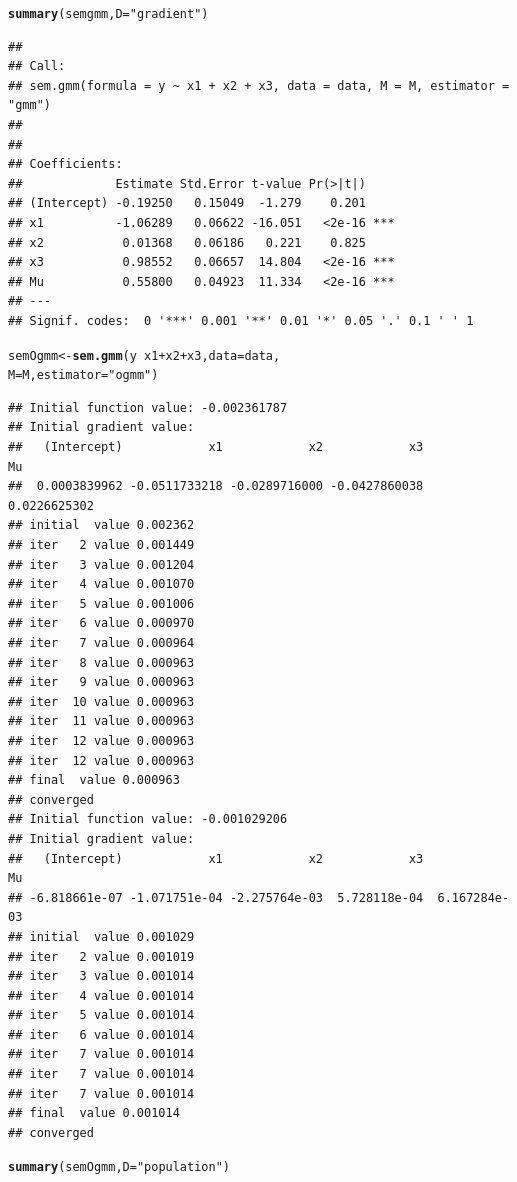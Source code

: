 \documentclass[english,12pt]{book}\usepackage[]{graphicx}\usepackage[]{xcolor}
\makeatletter
\newcommand{\hlsng}[1]{\textcolor[rgb]{0.192,0.494,0.8}{#1}}%
\newcommand{\hlopt}[1]{\textcolor[rgb]{0,0,0}{#1}}%
\newcommand{\hldef}[1]{\textcolor[rgb]{0.345,0.345,0.345}{#1}}%
\newcommand{\hlkwb}[1]{\textcolor[rgb]{0.69,0.353,0.396}{#1}}%
\newcommand{\hlkwc}[1]{\textcolor[rgb]{0.333,0.667,0.333}{#1}}%
\newcommand{\hlkwd}[1]{\textcolor[rgb]{0.737,0.353,0.396}{\textbf{#1}}}%
\newenvironment{kframe}{%
 \def\at@end@of@kframe{}%
 \ifinner\ifhmode%
  \def\at@end@of@kframe{\end{minipage}}%
  \begin{minipage}{\columnwidth}%
 \fi\fi%
 \def\FrameCommand##1{\hskip\@totalleftmargin \hskip-\fboxsep
 \colorbox{shadecolor}{##1}\hskip-\fboxsep
     \hskip-\linewidth \hskip-\@totalleftmargin \hskip\columnwidth}%
 \MakeFramed {\advance\hsize-\width
   \@totalleftmargin\z@ \linewidth\hsize
   \@setminipage}}%
 {\par\unskip\endMakeFramed%
 \at@end@of@kframe}
\newenvironment{knitrout}{}{} %
\let\hlstd\hldef
\let\hlstr\hlsng
\makeatother
\begin{document}
\begin{knitrout}
\begin{kframe}
\begin{alltt}
\hlkwd{summary}\hlstd{(semgmm,} \hlkwc{D} \hlstd{=} \hlstr{"gradient"}\hlstd{)}
\end{alltt}
\begin{verbatim}
## 
## Call:
## sem.gmm(formula = y ~ x1 + x2 + x3, data = data, M = M, estimator = "gmm")
## 
## 
## Coefficients:
##             Estimate Std.Error t-value Pr(>|t|)    
## (Intercept) -0.19250   0.15049  -1.279    0.201    
## x1          -1.06289   0.06622 -16.051   <2e-16 ***
## x2           0.01368   0.06186   0.221    0.825    
## x3           0.98552   0.06657  14.804   <2e-16 ***
## Mu           0.55800   0.04923  11.334   <2e-16 ***
## ---
## Signif. codes:  0 '***' 0.001 '**' 0.01 '*' 0.05 '.' 0.1 ' ' 1
\end{verbatim}
\begin{alltt}
\hlstd{semOgmm} \hlkwb{<-} \hlkwd{sem.gmm}\hlstd{(y} \hlopt{~} \hlstd{x1} \hlopt{+} \hlstd{x2} \hlopt{+} \hlstd{x3,} \hlkwc{data} \hlstd{= data,}
                  \hlkwc{M} \hlstd{= M,} \hlkwc{estimator} \hlstd{=} \hlstr{"ogmm"}\hlstd{)}
\end{alltt}
\begin{verbatim}
## Initial function value: -0.002361787 
## Initial gradient value:
##   (Intercept)            x1            x2            x3            Mu 
##  0.0003839962 -0.0511733218 -0.0289716000 -0.0427860038  0.0226625302 
## initial  value 0.002362 
## iter   2 value 0.001449
## iter   3 value 0.001204
## iter   4 value 0.001070
## iter   5 value 0.001006
## iter   6 value 0.000970
## iter   7 value 0.000964
## iter   8 value 0.000963
## iter   9 value 0.000963
## iter  10 value 0.000963
## iter  11 value 0.000963
## iter  12 value 0.000963
## iter  12 value 0.000963
## final  value 0.000963 
## converged
## Initial function value: -0.001029206 
## Initial gradient value:
##   (Intercept)            x1            x2            x3            Mu 
## -6.818661e-07 -1.071751e-04 -2.275764e-03  5.728118e-04  6.167284e-03 
## initial  value 0.001029 
## iter   2 value 0.001019
## iter   3 value 0.001014
## iter   4 value 0.001014
## iter   5 value 0.001014
## iter   6 value 0.001014
## iter   7 value 0.001014
## iter   7 value 0.001014
## iter   7 value 0.001014
## final  value 0.001014 
## converged
\end{verbatim}
\begin{alltt}
\hlkwd{summary}\hlstd{(semOgmm,} \hlkwc{D} \hlstd{=} \hlstr{"population"}\hlstd{)}
\end{alltt}
\begin{verbatim}

\end{verbatim}
\end{kframe}
\end{knitrout}
\end{document}
